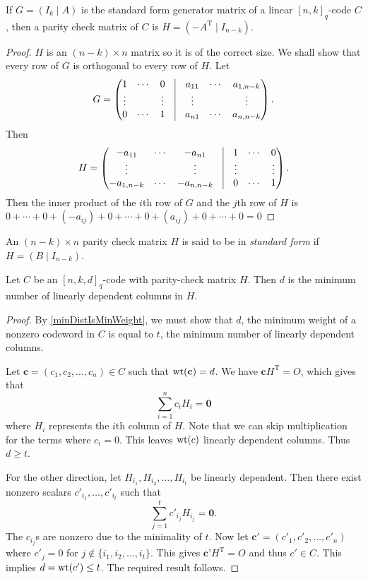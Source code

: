 \begin{theorem}
    If $G=(I_k\mid A)$ is the standard form generator matrix of a linear $[n,k]_q$-code $C$, then a parity check matrix of $C$ is $H=(-A^\text{T}\mid I_{n-k})$.
\end{theorem}
\begin{proof}
   $H$ is an $(n-k)\times n$ matrix so it is of the correct size. We shall show that every row of $G$ is orthogonal to every row of $H$.
   Let
   $$G=
   \begin{pmatrix}
   1 & \cdots & 0 & \vline & a_{11} & \cdots & a_{1,n-k} \\
   \vdots & & \vdots  & \vline & \vdots & & \vdots \\
   0 & \cdots & 1 & \vline & a_{n1} & \cdots & a_{n,n-k}
   \end{pmatrix}.
   $$
   Then
   $$H=
   \begin{pmatrix}
   -a_{11} & \cdots & -a_{n1} & \vline & 1 & \cdots & 0 \\
   \vdots & & \vdots & \vline & \vdots & & \vdots \\
   -a_{1,n-k} & \cdots & -a_{n,n-k} & \vline & 0 & \cdots & 1
   \end{pmatrix}.
   $$
   Then the inner product of the $i$th row of $G$ and the $j$th row of $H$ is
   $0+\cdots+0+(-a_{ij})+0+\cdots+0+(a_{ij})+0+\cdots+0=0$
\end{proof}

\begin{definition}
    An $(n-k)\times n$ parity check matrix $H$ is said to be in \textit{standard form} if $H=(B\mid I_{n-k})$.
\end{definition}

\begin{theorem}
\label{minLinearlyDependentColumns}
    Let $C$ be an $[n,k,d]_q$-code with parity-check matrix $H$. Then $d$ is the minimum number of linearly dependent columns in $H$.
\end{theorem}
\begin{proof}
   By \ref{minDistIsMinWeight}, we must show that $d$, the minimum weight of a nonzero codeword in $C$ is equal to $t$, the minimum number of linearly dependent columns.
   
   \vspace{1mm}
   Let $\textbf{c}=(c_1,c_2,\ldots,c_n)\in C$ such that $\operatorname{wt}(\textbf{c})=d$. We have $\textbf{c}H^\text{T}=O$, which gives that
   $$\sum_{i=1}^n c_iH_i=\textbf{0}$$
   where $H_i$ represents the $i$th column of $H$. Note that we can skip multiplication for the terms where $c_i=0$. This leaves $\operatorname{wt}(c)$ linearly dependent columns. Thus $d\geq t$.
   
   \vspace{1mm}
   For the other direction, let $H_{i_1}, H_{i_2}, \ldots, H_{i_t}$ be linearly dependent. Then there exist nonzero scalars $c'_{i_1}, \ldots, c'_{i_t}$ such that
   $$\sum_{j=1}^t c'_{i_j}H_{i_j}=\textbf{0}.$$
   The $c_{i_j}$s are nonzero due to the minimality of $t$. Now let $\textbf{c}'=(c'_1,c'_2,\ldots,c'_n)$ where $c'_{j}=0$ for $j\not\in\{i_1,i_2,\ldots,i_t\}$. This gives $\textbf{c'}H^\text{T}=O$ and thus $c'\in C$. This implies $d=\operatorname{wt}(c')\leq t$. The required result follows.
\end{proof}

